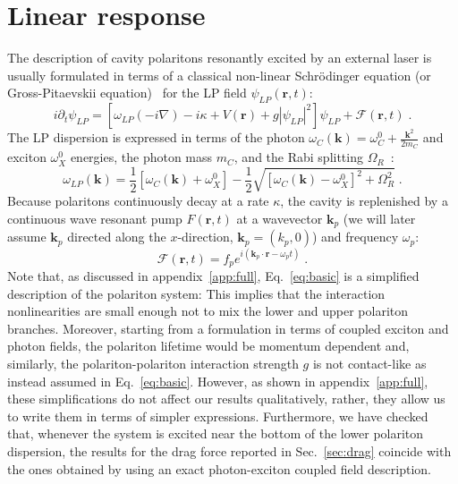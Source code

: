 \section{Linear response}
\label{sec:linea}

The description of cavity polaritons resonantly excited by an external
laser is usually formulated in terms of a classical non-linear
Schr\"odinger equation (or Gross-Pitaevskii equation)~\cite{Ciuti_2003}
for the LP field $\psi_{LP}(\bm{r}, t)$:
%
\begin{equation}
  i \partial_t \psi_{LP} = [\omega_{LP}(-i\nabla) - i\kappa +
    V(\bm{r}) + g |\psi_{LP}|^2]\psi_{LP} + \mathcal{F}(\bm{r},t)\; .
\label{eq:basic}
\end{equation}
%
The LP dispersion is expressed in terms of the photon
$\omega_C(\bm{k}) = \omega_C^0 + \frac{\bm{k}^2}{2m_C}$ and
exciton $\omega_X^0$ energies, the photon mass $m_C$, and the Rabi
splitting $\Omega_R$~\cite{9780199228942}:
%
\begin{equation}
  \omega_{LP}(\bm{k}) = \frac{1}{2} \left[\omega_C(\bm{k}) +
    \omega_X^0\right]  - \frac{1}{2} \sqrt{\left[\omega_C(\bm{k}) -
    \omega_X^0 \right]^2 + \Omega_R^2} \; .
\label{eq:dispe}
\end{equation}
%
Because polaritons continuously decay at a rate $\kappa$, the cavity
is replenished by a continuous wave resonant pump $F(\bm{r},t)$ at a
wavevector $\bm{k}_p$ (we will later assume $\bm{k}_p$ directed
along the $x$-direction, $\bm{k}_p = (k_p,0)$) and frequency
$\omega_p$:
\begin{equation}
  \mathcal{F}(\bm{r},t) = f_p e^{i (\bm{k}_p \cdot \bm{r} -
    \omega_p t)} \; .
\end{equation}
%
Note that, as discussed in appendix~\ref{app:full},
Eq.~\eqref{eq:basic} is a simplified description of the polariton
system: This implies that the interaction nonlinearities are small
enough not to mix the lower and upper polariton branches. Moreover,
starting from a formulation in terms of coupled exciton and photon
fields, the polariton lifetime would be momentum dependent and,
similarly, the polariton-polariton interaction strength $g$ is not
contact-like as instead assumed in Eq.~\eqref{eq:basic}. However, as
shown in appendix~\ref{app:full}, these simplifications do not affect
our results qualitatively, rather, they allow us to write them in terms of
simpler expressions. Furthermore, we have checked that, whenever the
system is excited near the bottom of the lower polariton dispersion,
the results for the drag force reported in Sec.~\ref{sec:drag}
coincide with the ones obtained by using an exact photon-exciton
coupled field description.

